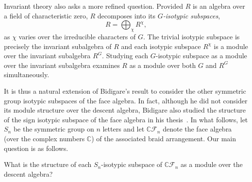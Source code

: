 \documentclass[ALCO, Unicode]{cedram}
\def\C{{\mathbb{C}}}
\begin{document}
Invariant theory also asks a more refined question. Provided $R$ is an algebra over a field of characteristic zero, $R$ decomposes into its \textit{$G$-isotypic subspaces}, \[R = \bigoplus_{\chi}R^\chi,\] as $\chi$ varies over the irreducible characters of $G.$ The trivial isotypic subspace is precisely the invariant subalgebra of $R$ and each isotypic subspace $R^\chi$ is a module over the invariant subalgebra $R^G.$ Studying each $G$-isotypic subspace as a module over the invariant subalgebra examines $R$ as a module over both $G$ and $R^G$ simultaneously.

It is thus a natural extension of Bidigare's result to consider the other symmetric group isotypic subspaces of the face algebra. In fact, although he did not consider its module structure over the descent algebra,  Bidigare also studied the structure of the sign isotypic subspace of the face algebra in his thesis~\cite[\S 3.5.3]{Bidigare}. In what follows, let $S_n$ be the symmetric group on $n$ letters and let $\C \mathcal{F}_n$ denote the face algebra (over the complex numbers $\C$) of the associated braid arrangement.  Our main question is as follows.

\begin{question}\label{question:OG-pre}
    What is the structure of each $S_n$-isotypic subspace of $\C \mathcal{F}_n$ as a module over the descent algebra?
\end{question}
\end{document}
